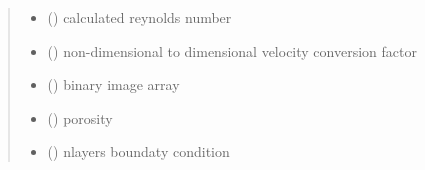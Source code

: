 \documentclass[letterpaper,10pt,english]{sphinxmanual}
\begin{document}
\begin{fulllineitems}
\begin{quote}
\begin{description}
\begin{itemize}
\item {} 
 () \textendash{} calculated reynolds number

\item {} 
 () \textendash{} non-dimensional to dimensional velocity conversion factor

\item {} 
 () \textendash{} binary image array

\item {} 
 () \textendash{} porosity

\item {} 
 () \textendash{} nlayers boundaty condition

\end{itemize}

\end{description}\end{quote}

\end{fulllineitems}

\end{document}

